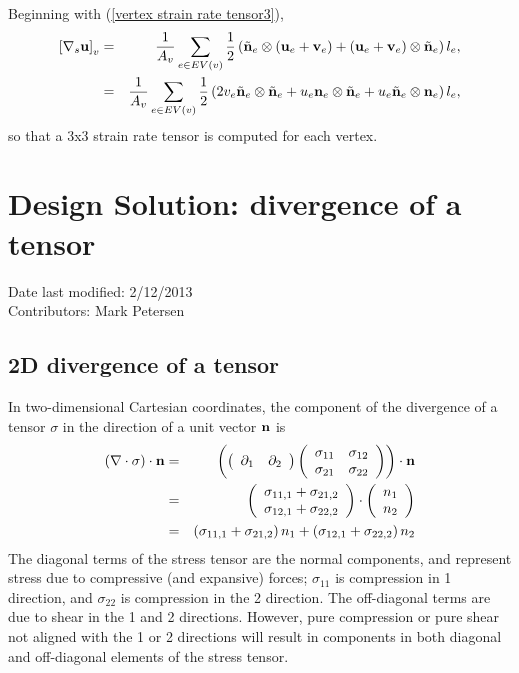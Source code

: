 \documentclass[11pt]{report}
\begin{document}
Beginning with (\ref{vertex strain rate tensor3}),
\begin{eqnarray}
\label{vertex strain rate tensor3}
\left[\nabla_s {\bf u} \right]_v
&=& \displaystyle \frac{1}{A_v} 
\sum_{e\in EV(v)}{\frac{1}{2}\left( 
  \tilde{\bf n}_e\otimes\left({\bf u}_e +{\bf v}_e \right)
+ \left({\bf u}_e +{\bf v}_e \right)\otimes\tilde{\bf n}_e\right)l_e },
\\
&=& \displaystyle \frac{1}{A_v} 
\sum_{e\in EV(v)}{\frac{1}{2}\left( 
 2v_e\tilde{\bf n}_e\otimes\tilde{\bf n}_e
+ u_e{\bf n}_e\otimes\tilde{\bf n}_e
+ u_e\tilde{\bf n}_e\otimes{\bf n}_e
\right)l_e },
\end{eqnarray}
so that a 3x3 strain rate tensor is computed for each vertex.

\newpage
\section{Design Solution: divergence of a tensor}
Date last modified: 2/12/2013 \\
Contributors: Mark Petersen \\

\subsection{2D divergence of a tensor}

In two-dimensional Cartesian coordinates, the component of the divergence of a tensor $\sigma$ in the direction of a unit vector ${\bf n}$ is 
\begin{eqnarray}
\left(\nabla\cdot\sigma\right)\cdot{\bf n}
 &=& \left(
\left(\begin{array}{cc} \partial_1 &  \partial_2 \end{array} \right)
\left(\begin{array}{cc} \sigma_{11} &  \sigma_{12} \\
                        \sigma_{21} &  \sigma_{22} \end{array} \right)
\right)\cdot{\bf n}\\
 &=& 
\left(\begin{array}{c} \sigma_{11,1} + \sigma_{21,2} \\
                        \sigma_{12,1} + \sigma_{22,2} \end{array}
\right)\cdot\left(\begin{array}{c} n_1 \\ n_2 \end{array} \right)\\
\label{sigma1}
 &=& 
  \left( \sigma_{11,1} + \sigma_{21,2}\right) n_1
+ \left( \sigma_{12,1} + \sigma_{22,2}\right) n_2
\end{eqnarray}
The diagonal terms of the stress tensor are the normal components, and represent stress due to compressive (and expansive) forces; $\sigma_{11}$ is compression in 1 direction, and $\sigma_{22}$ is compression in the 2 direction.  The off-diagonal terms are due to shear in the 1 and 2 directions.  However, pure compression or pure shear not aligned with the 1 or 2 directions will result in components in both diagonal and off-diagonal elements of the stress tensor.
\end{document}
